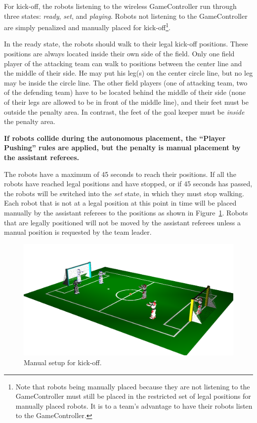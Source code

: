 \documentclass[12pt]{article}
\newcommand{\KickOffAutoTime}{{45 seconds }}
\begin{document}
For kick-off, the robots listening to the wireless GameController
run through three states: \emph{ready},
\emph{set}, and \emph{playing}.  Robots not listening to the
GameController are simply penalized and manually placed for kick-off\footnote{
Note that robots being manually placed because they are not listening to the
GameController must still be placed in the restricted set of legal positions
for manually placed robots.  It is to a team's advantage to have their robots
listen to the GameController.}.

In the ready state, the robots should walk
to their legal kick-off positions. These positions are always
located inside their own side of the field. Only one field player
of the attacking team can walk to positions between the center line
and the middle of their side. He may put his leg(s) on the
center circle line, but no leg may be inside the circle line. The
other field players (one of attacking team, two of the defending team)
have to be located behind the middle of their side (none of their
legs are allowed to be in front of the middle line), and their feet must be outside the penalty area.
In contrast, the feet of the goal keeper must be \emph{inside}
the penalty area.

\textbf{If robots collide during the autonomous placement, the ``Player Pushing'' rules are applied, but
the penalty is manual placement by the assistant referees.}

The robots have a maximum of \KickOffAutoTime to reach their positions.
If all the robots have reached legal positions and have stopped, or
if \KickOffAutoTime has passed, the robots will be switched into the
\emph{set} state, in which they
must stop walking. Each robot that is not at a legal position at
this point in time will be placed manually by the assistant referees
to the positions as shown in Figure~\ref{fig:ko}. Robots
that are legally positioned will not be moved by the assistant
referees unless a manual position is requested by the team leader.

\begin{figure}[t]
\centerline{\includegraphics[width=\columnwidth]{figs/Kickoff3vs3}}
\caption{Manual setup for kick-off.}
\label{fig:ko}
\end{figure}
\end{document}
